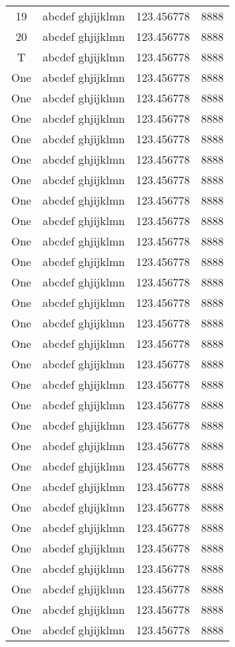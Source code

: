 \begin{center}
\begin{longtable}{| c | L{4cm} | L{6cm} | L{4cm} |}
19 & abcdef ghjijklmn & 123.456778 & 8888 \\
20 & abcdef ghjijklmn & 123.456778 & 8888 \\
T & abcdef ghjijklmn & 123.456778 & 8888 \\
One & abcdef ghjijklmn & 123.456778 & 8888 \\
One & abcdef ghjijklmn & 123.456778 & 8888 \\
One & abcdef ghjijklmn & 123.456778 & 8888 \\
One & abcdef ghjijklmn & 123.456778 & 8888 \\
One & abcdef ghjijklmn & 123.456778 & 8888 \\
One & abcdef ghjijklmn & 123.456778 & 8888 \\
One & abcdef ghjijklmn & 123.456778 & 8888 \\
One & abcdef ghjijklmn & 123.456778 & 8888 \\
One & abcdef ghjijklmn & 123.456778 & 8888 \\
One & abcdef ghjijklmn & 123.456778 & 8888 \\
One & abcdef ghjijklmn & 123.456778 & 8888 \\
One & abcdef ghjijklmn & 123.456778 & 8888 \\
One & abcdef ghjijklmn & 123.456778 & 8888 \\
One & abcdef ghjijklmn & 123.456778 & 8888 \\
One & abcdef ghjijklmn & 123.456778 & 8888 \\
One & abcdef ghjijklmn & 123.456778 & 8888 \\
One & abcdef ghjijklmn & 123.456778 & 8888 \\
One & abcdef ghjijklmn & 123.456778 & 8888 \\
One & abcdef ghjijklmn & 123.456778 & 8888 \\
One & abcdef ghjijklmn & 123.456778 & 8888 \\
One & abcdef ghjijklmn & 123.456778 & 8888 \\
One & abcdef ghjijklmn & 123.456778 & 8888 \\
One & abcdef ghjijklmn & 123.456778 & 8888 \\
One & abcdef ghjijklmn & 123.456778 & 8888 \\
One & abcdef ghjijklmn & 123.456778 & 8888 \\
One & abcdef ghjijklmn & 123.456778 & 8888 \\
One & abcdef ghjijklmn & 123.456778 & 8888 \\
One & abcdef ghjijklmn & 123.456778 & 8888 \\

\end{longtable}
\end{center}
